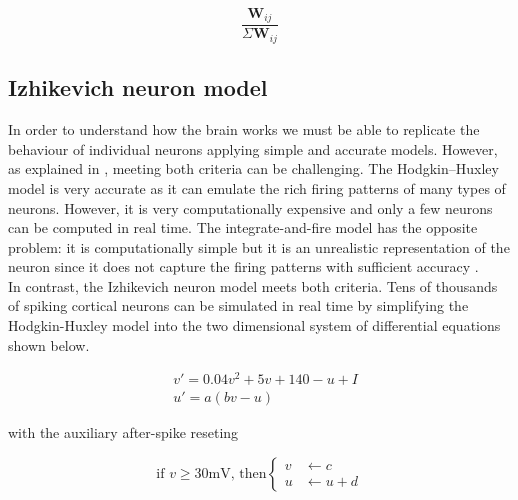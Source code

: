 \documentclass[11pt]{article}
\begin{document}
\begin{equation}\label{eq:synaptic_contribution}
\frac{\textbf{W}_{ij}}{\Sigma \textbf{W}_{ij}}
\end{equation}

\subsection{Izhikevich neuron model}\label{sec:izhikevich_neuron_model}

In order to understand how the brain works we must be able to replicate the behaviour of individual neurons applying simple and accurate models. However, as explained in \cite{izhikevich2003simple}, meeting both criteria can be challenging. The Hodgkin–Huxley model \cite{hodgkin1952quantitative} is very accurate as it can emulate the rich firing patterns of many types of neurons. However, it is very computationally expensive and only a few neurons can be computed in real time. The integrate-and-fire model \cite{burkitt2006review}  has the opposite problem: it is computationally simple but it is an unrealistic representation of the neuron since it does not capture the firing patterns with sufficient accuracy \cite{izhikevich2003simple}.
\\
In contrast, the Izhikevich neuron model \cite{izhikevich2003simple} meets both criteria. Tens of thousands of spiking cortical neurons can be simulated in real time by simplifying the Hodgkin-Huxley model into the two dimensional system of differential equations shown below.


\begin{align}\label{eq:izhikevich_ode}
&v'=0.04v^{2}+5v+140-u+I \\
&u'=a(bv-u)
\end{align}

with the auxiliary after-spike reseting

\begin{equation}\label{eq:izhikevich_reset}
\text{if } v \geq 30 \text{mV, then}
\begin{cases}
    v     & \leftarrow c \\
    u     & \leftarrow u + d 
  \end{cases}
\end{equation}
\end{document}
